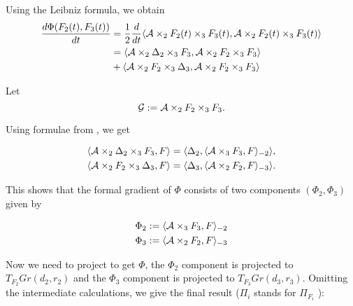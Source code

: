 
Using the Leibniz formula, we obtain
\begin{equation}
\begin{split}
\frac{d\Phi(F_2(t), F_3(t))} {dt} &= \frac{1}{2} \frac{d}{dt} \langle \mathcal{A} \times_2 F_2(t) \times_3 F_3(t), \mathcal{A} \times_2 F_2(t) \times_3 F_3(t) \rangle   \\
 &= \langle \mathcal{A} \times_2 \Delta_2 \times_3 F_3, \mathcal{A} \times_2 F_2 \times_3 F_3 \rangle  \\ 
 & +  \langle \mathcal{A} \times_2 F_2 \times_3 \Delta_3 , \mathcal{A} \times_2 F_2 \times_3 F_3 \rangle 
 \end{split}
\end{equation}

Let
\begin{equation}
\mathcal{G} := \mathcal{A} \times_2 {F_2} \times_3 {F_3}.
\end{equation}

Using formulae from \cite{elden_savas_2009}, we get

\begin{eqnarray}
\langle \mathcal{A} \times_2 \Delta{_2} \times_3 {F_3}, F \rangle = \langle \Delta{_2}, \langle  \mathcal{A} \times_3 {F_3}, F \rangle _{-2} \rangle, \\
\langle \mathcal{A} \times_2 {F_2} \times_3 \Delta{_3}, F \rangle = \langle \Delta{_3}, \langle  \mathcal{A} \times_2 {F_2}, F \rangle _{-3} \rangle.
\end{eqnarray}

This shows that the formal gradient of $\Phi$ consists of two components $(\Phi_2, \Phi_3)$
given by

\begin{eqnarray}
\label{formal_grad_phi}
\Phi{_2} := \langle  \mathcal{A} \times_3 {F_3}, F \rangle _{-2} \\
\Phi{_3} := \langle  \mathcal{A} \times_2 {F_2}, F \rangle _{-3}
\end{eqnarray}

Now we need to project to get $\Phi$, the $\Phi_2$ component is projected to $T_{F_2}Gr(d_2, r_2)$ and
the $\Phi_3$ component is projected to $T_{F_3}Gr(d_3, r_3)$. Omitting the intermediate calculations,
we give the final result ($\Pi_i$ stands for $\Pi_{F_i}$ ):

